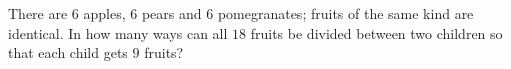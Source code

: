 There are $6$ apples, $6$ pears and $6$ pomegranates; fruits of the same kind are identical. In how many ways can all $18$ fruits be divided between two children so that each child gets $9$ fruits?
